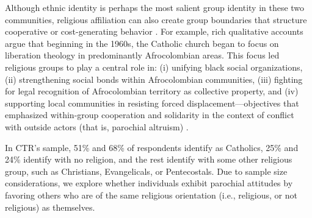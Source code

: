 \documentclass[bibauthoryear]{aa}
\begin{document}
Although ethnic identity is perhaps the most salient group identity in these two communities, religious affiliation can also create group boundaries that  structure cooperative or cost-generating behavior  \citep[e.g.,][]{lang2019moralizing, purzycki2016moralistic, hruschka2014impartial}. For example, rich qualitative accounts \citep[e.g.,][]{oyola2015religion} argue that beginning in the 1960s,  the Catholic church began to focus on liberation theology in predominantly Afrocolombian areas. This focus led religious groups to play a central role in: (i) unifying black social organizations,  (ii) strengthening social bonds within Afrocolombian communities, (iii) fighting for legal recognition of Afrocolombian territory as collective property, and (iv) supporting local communities in resisting forced displacement---objectives that emphasized within-group cooperation and solidarity in the context of conflict with outside actors (that is, parochial altruism) \citep{oyola2017local}.

In CTR's sample, 51\% and 68\% of respondents identify as Catholics, 25\% and 24\% identify with no religion, and the rest identify with some other religious group, such as Christians, Evangelicals, or Pentecostals. Due to sample size considerations, we explore whether individuals exhibit parochial attitudes by favoring others who are of the same religious orientation (i.e., religious, or not religious) as themselves.
\end{document}
